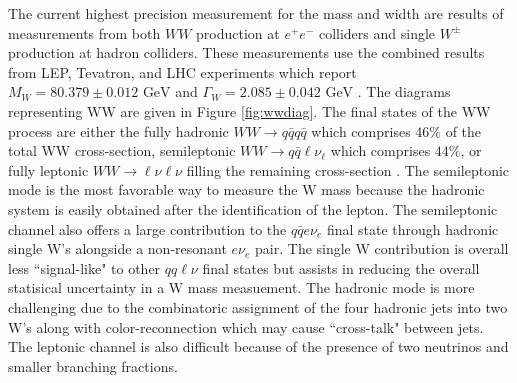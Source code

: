 


 The current highest precision measurement for the mass and width are results of measurements from both $WW$ production at $e^+ e^-$ colliders and single $W^\pm$ production at hadron colliders. These measurements use the combined results from LEP, Tevatron, and LHC experiments which report $M_W = 80.379 \pm 0.012 \, \, \text{GeV} $ and $\Gamma_W = 2.085 \pm 0.042 \,  \,\text{GeV}$ \cite{pdg}. The diagrams representing WW are given in Figure \ref{fig:wwdiag}. The final states of the WW process are either the fully hadronic $WW\rightarrow q\bar{q}q\bar{q}$ which comprises $46\%$ of the total WW cross-section, semileptonic $WW\rightarrow q\bar{q}\ell\nu_{\ell}$ which comprises $44\%$, or fully leptonic $WW\rightarrow \ell \nu \ell \nu$ filling the remaining cross-section \cite{wwOPAL}. The semileptonic mode is the most favorable way to measure the W mass because the hadronic system is easily obtained after the identification of the lepton. The semileptonic channel also offers a large contribution to the $q\bar{q}e\nu_e$ final state through hadronic single W's alongside a non-resonant $e \nu_e$ pair. The single W contribution is overall less ``signal-like" to other $qq\ell\nu$ final states but assists in reducing the overall statisical uncertainty in a W mass measuement. The hadronic mode is more challenging due to the combinatoric assignment of the four hadronic jets into two W's along with color-reconnection which may cause ``cross-talk" between jets. The leptonic channel is also difficult because of the presence of two neutrinos and smaller branching fractions.

